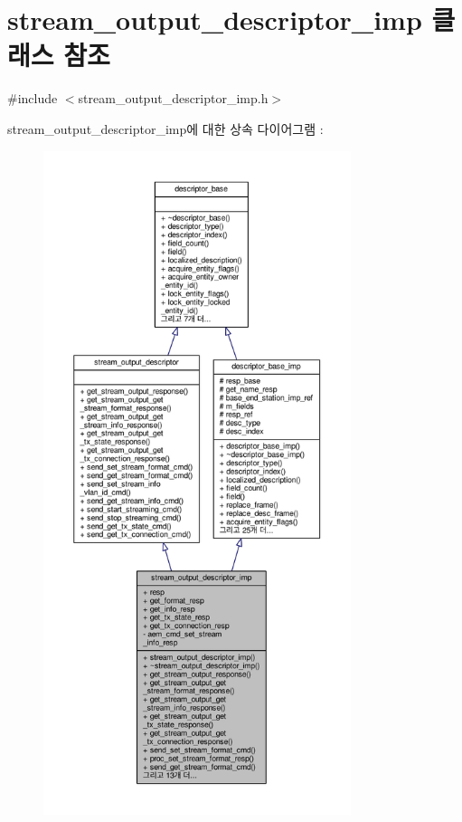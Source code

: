 \hypertarget{classavdecc__lib_1_1stream__output__descriptor__imp}{}\section{stream\+\_\+output\+\_\+descriptor\+\_\+imp 클래스 참조}
\label{classavdecc__lib_1_1stream__output__descriptor__imp}


{\ttfamily \#include $<$stream\+\_\+output\+\_\+descriptor\+\_\+imp.\+h$>$}



stream\+\_\+output\+\_\+descriptor\+\_\+imp에 대한 상속 다이어그램 \+: 
\nopagebreak
\begin{figure}[H]
\begin{center}
\leavevmode
\includegraphics[height=550pt]{classavdecc__lib_1_1stream__output__descriptor__imp__inherit__graph}
\end{center}
\end{figure}


